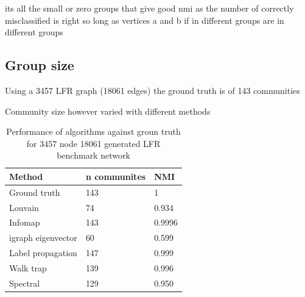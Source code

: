 

its all the small or zero groups that give good nmi as the number of correctly misclassified is right so long as vertices a and b if in different groups are in different groups 

\subsection{Group size}

Using a 3457 LFR graph (18061 edges) the ground truth is of 143 communities

Community size however varied with different methods


\begin{table}[]
    \centering
    \begin{tabular}{lll}
    \toprule
        Method & n communites & NMI  \\
        \midrule
        Ground truth  & 143 & 1 \\
        Louvain & 74 & 0.934 \\
        Infomap & 143 & 0.9996 \\
        igraph eigenvector & 60 & 0.599\\
        Label propagation & 147 & 0.999\\
        Walk trap & 139 & 0.996\\
        Spectral & 129 & 0.950\\
        \bottomrule
    \end{tabular}
    \caption{Performance of algorithms against groun truth for 3457 node 18061 generated LFR benchmark network}
    \label{tab:benchmark Performance of algorithms against groun truth for 3457 node 18061 generated LFR benchmark network}
\end{table}

 
 
 
 
 
 


